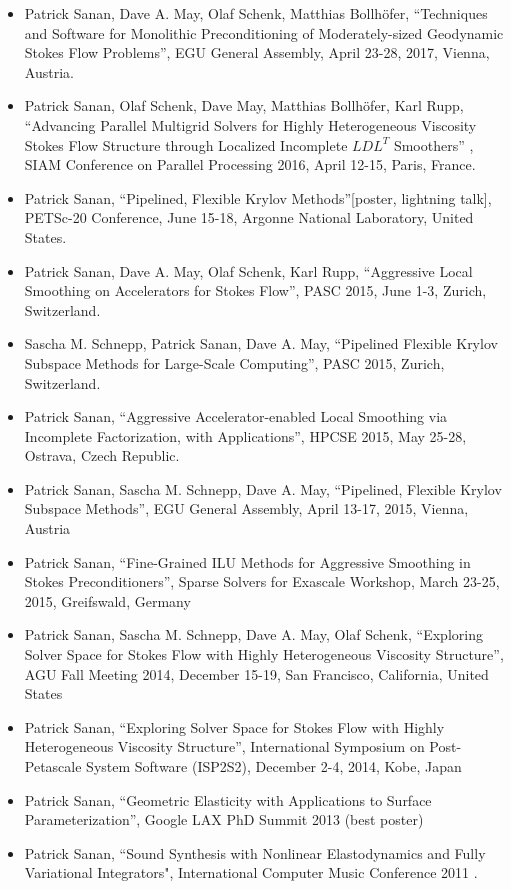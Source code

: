 \documentclass[12pt]{article}
\begin{document}
\begin{itemize}
\item Patrick Sanan, Dave A. May, Olaf Schenk, Matthias Bollh\"{o}fer, ``Techniques and Software for Monolithic Preconditioning of Moderately-sized Geodynamic Stokes Flow Problems'', EGU General Assembly, April 23-28, 2017, Vienna, Austria.
\item Patrick Sanan, Olaf Schenk, Dave May, Matthias Bollh\"{o}fer, Karl Rupp, ``Advancing Parallel Multigrid Solvers for Highly Heterogeneous Viscosity Stokes Flow Structure through Localized Incomplete $LDL^T$ Smoothers'' , SIAM Conference on Parallel Processing 2016, April 12-15, Paris, France.
\item Patrick Sanan, ``Pipelined, Flexible Krylov Methods''[poster, lightning talk], PETSc-20 Conference, June 15-18, Argonne National Laboratory, United States.
\item Patrick Sanan, Dave A. May, Olaf Schenk, Karl Rupp, ``Aggressive Local Smoothing on Accelerators for Stokes Flow'', PASC 2015, June 1-3, Zurich, Switzerland.
\item Sascha M. Schnepp, Patrick Sanan, Dave A. May, ``Pipelined Flexible Krylov Subspace Methods for Large-Scale Computing'', PASC 2015, Zurich, Switzerland.
\item Patrick Sanan, ``Aggressive Accelerator-enabled Local Smoothing via Incomplete Factorization, with Applications'', HPCSE 2015, May 25-28, Ostrava, Czech Republic.
\item Patrick Sanan, Sascha M. Schnepp, Dave A. May, ``Pipelined, Flexible Krylov Subspace Methods'', EGU General Assembly, April 13-17, 2015, Vienna, Austria
\item Patrick Sanan, ``Fine-Grained ILU Methods for Aggressive Smoothing in Stokes Preconditioners'', Sparse Solvers for Exascale Workshop, March 23-25, 2015, Greifswald, Germany
\item Patrick Sanan, Sascha M. Schnepp, Dave A. May, Olaf Schenk, ``Exploring Solver Space for Stokes Flow with Highly Heterogeneous Viscosity Structure'', AGU Fall Meeting 2014, December 15-19, San Francisco, California, United States
\item Patrick Sanan, ``Exploring Solver Space for Stokes Flow with Highly Heterogeneous Viscosity Structure'', International Symposium on Post-Petascale System Software (ISP2S2), December 2-4, 2014, Kobe, Japan
\item Patrick Sanan, ``Geometric Elasticity with Applications to Surface Parameterization'', Google LAX PhD Summit 2013 (best poster)
\item Patrick Sanan, ``Sound Synthesis with Nonlinear Elastodynamics and Fully Variational Integrators", International Computer Music Conference 2011 .
\end{itemize}
\end{document}
